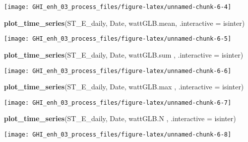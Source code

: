 \documentclass[
  10pt,
  a4paper,oneside]{article}
\newenvironment{Shaded}{\begin{snugshade}}{\end{snugshade}}
\newcommand{\AttributeTok}[1]{\textcolor[rgb]{0.13,0.29,0.53}{#1}}
\newcommand{\FunctionTok}[1]{\textcolor[rgb]{0.13,0.29,0.53}{\textbf{#1}}}
\newcommand{\NormalTok}[1]{#1}
\begin{document}
\begin{center}\texttt{[image: GHI\_enh\_03\_process\_files/figure-latex/unnamed-chunk-6-4]} \end{center}

\begin{Shaded}
\begin{Highlighting}[]
\FunctionTok{plot\_time\_series}\NormalTok{(ST\_E\_daily, Date, wattGLB.mean, }\AttributeTok{.interactive =}\NormalTok{ isinter)}
\end{Highlighting}
\end{Shaded}

\begin{center}\texttt{[image: GHI\_enh\_03\_process\_files/figure-latex/unnamed-chunk-6-5]} \end{center}

\begin{Shaded}
\begin{Highlighting}[]
\FunctionTok{plot\_time\_series}\NormalTok{(ST\_E\_daily, Date, wattGLB.sum , }\AttributeTok{.interactive =}\NormalTok{ isinter)}
\end{Highlighting}
\end{Shaded}

\begin{center}\texttt{[image: GHI\_enh\_03\_process\_files/figure-latex/unnamed-chunk-6-6]} \end{center}

\begin{Shaded}
\begin{Highlighting}[]
\FunctionTok{plot\_time\_series}\NormalTok{(ST\_E\_daily, Date, wattGLB.max , }\AttributeTok{.interactive =}\NormalTok{ isinter)}
\end{Highlighting}
\end{Shaded}

\begin{center}\texttt{[image: GHI\_enh\_03\_process\_files/figure-latex/unnamed-chunk-6-7]} \end{center}

\begin{Shaded}
\begin{Highlighting}[]
\FunctionTok{plot\_time\_series}\NormalTok{(ST\_E\_daily, Date, wattGLB.N   , }\AttributeTok{.interactive =}\NormalTok{ isinter)}
\end{Highlighting}
\end{Shaded}

\begin{center}\texttt{[image: GHI\_enh\_03\_process\_files/figure-latex/unnamed-chunk-6-8]} \end{center}
\end{document}
